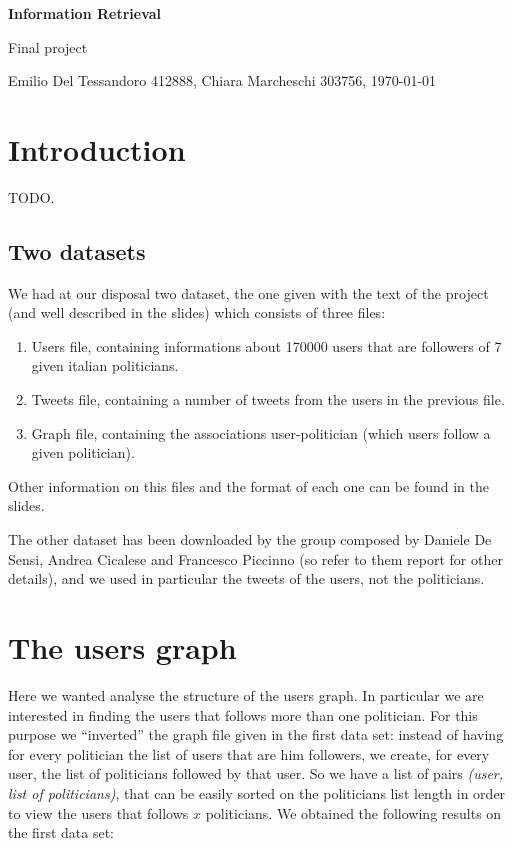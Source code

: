 \documentclass[a4paper,11pt,oneside]{article}
\begin{document}
\begin{center}\begin{huge}\textbf{Information Retrieval}\end{huge}
\medskip 

\begin{huge}Final project\end{huge}
\bigskip 

\begin{large}
Emilio Del Tessandoro 412888, Chiara Marcheschi 303756, \today
\end{large}
\end{center}


\section{Introduction}
\label{sec:intro}

TODO.

\subsection{Two datasets}
We had at our disposal two dataset, the one given with the text of the project (and well described in the slides) which consists of three files:
\begin{enumerate}
\item Users file, containing informations about 170000 users that are followers of 7 given italian politicians.
\item Tweets file, containing a number of tweets from the users in the previous file.
\item Graph file, containing the associations user-politician (which users follow a given politician).
\end{enumerate}
Other information on this files and the format of each one can be found in the slides.

The other dataset has been downloaded by the group composed by Daniele De Sensi, Andrea Cicalese and Francesco Piccinno (so refer to them report for other details), and we used in particular the tweets of the users, not the politicians.


\section{The users graph}
Here we wanted analyse the structure of the users graph. In particular we are interested in finding the users that follows more than one politician. For this purpose we ``inverted'' the graph file given in the first data set: instead of having for every politician the list of users that are him followers, we create, for every user, the list of politicians followed by that user.
So we have a list of pairs \textit{(user, list of politicians)}, that can be easily sorted on the politicians list length in order to view the users that follows $x$ politicians. We obtained the following results on the first data set:
\end{document}
